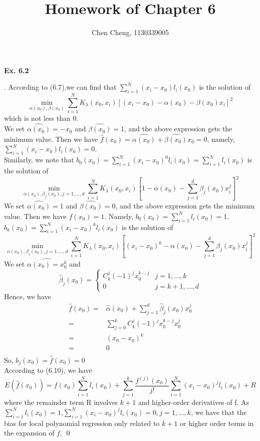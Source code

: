 \documentclass[12pt]{article}
\newenvironment{sol}
  {\par\vspace{3mm}\noindent{\it Solution}.}
  {\qed}
\begin{document}
\author{Chen Cheng, 1130339005}
\title{Homework of Chapter 6}
\maketitle

\begin{flushleft}
\textbf{Ex. 6.2}
\end{flushleft}
\begin{sol}
According to (6.7),we can find that $\sum_{i=1}^N(x_i-x_0)l_i(x_0)$ is the solution of
$$\min_{\alpha(x_0),\beta(x_0)}\sum_{i=1}^NK_\lambda(x_0,x_i)[(x_i-x_0)-\alpha(x_0)-\beta(x_0)x_i]^2$$
which is not less than 0.\\
We set $\hat{\alpha(x_0)}=-x_0$ and $\hat{\beta(x_0)}=1$, and the above expression gets the minimum value. Then we have $\hat{f}(x_0)=\hat{\alpha(x_0)}+\hat{\beta(x_0)}x_0=0$,
namely, $\sum_{i=1}^N(x_i-x_0)l_i(x_0)=0$.\\
Similarly, we note that $b_0(x_0)=\sum_{i=1}^N(x_i-x_0)^0l_i(x_0)=\sum_{i=1}^Nl_i(x_0)$ is the solution of
$$\min_{\alpha(x_0),\beta_j(x_0),j=1,\dots,d}\sum_{i=1}^NK_\lambda(x_0,x_i)\left[1-\alpha(x_0)-\sum_{j=1}^d\beta_j(x_0)x_i^j\right]^2$$
We set $\hat{\alpha(x_0)}=1$ and $\hat{\beta(x_0)}=0$, and the above expression gets the minimum value. Then we have $\hat{f(x_0)}=1$.
Namely, $b_0(x_0)=\sum_{i=1}^Nl_i(x_0)=1$.\\
$b_k(x_0)=\sum_{i=1}^N(x_i-x_0)^kl_i(x_0)$ is the solution of
$$\min_{\alpha(x_0),\beta_j(x_0),j=1,\dots,d}\sum_{i=1}^NK_\lambda(x_0,x_i)\left[(x_i-x_0)^k-\alpha(x_0)-\sum_{j=1}^d\beta_j(x_0)x_i^j\right]^2$$
We set $\hat{\alpha(x_0)=x_0^k}$ and
$$\hat{\beta}_j(x_0)=\left\{\begin{matrix}C_k^j(-1)^jx_0^{k-j} & j=1,\dots,k\\0 & j=k+1,\dots,d\end{matrix}\right.$$
Hence, we have
\begin{equation*}
\begin{split}
\hat{f}(x_0)=&\hat{\alpha}(x_0)+\sum_{j=1}^d\hat{\beta}_j(x_0)x_0^j\\
=&\sum_{j=0}^kC_k^j(-1)^jx_0^{k-j}x_0^j\\
=&(x_0-x_0)^k\\
=&0\\
\end{split}
\end{equation*}
So, $b_j(x_0)=\hat{f}(x_0)=0$\\
According to (6.10), we have
$$E(\hat{f}(x_0))=f(x_0)\sum_{i=1}^Nl_i(x_0)+ \sum_{j=1}^k\frac{f^{(j)}(x_0)}{j!}\sum_{i=1}^N(x_i-x_0)^jl_i(x_0)+R$$
where the remainder term R involves $k+1$ and higher-order derivatives of f. As $\sum_{i=1}^Nl_i(x_0)=1$,$\sum_{i=1}^N(x_i-x_0)^jl_i(x_0)=0, j=1,\dots,k$, we have that the bias for local polynomial
 regression only related to $k+1$ or higher order terms in the expansion of $f$.
\end{sol}
\end{document}

